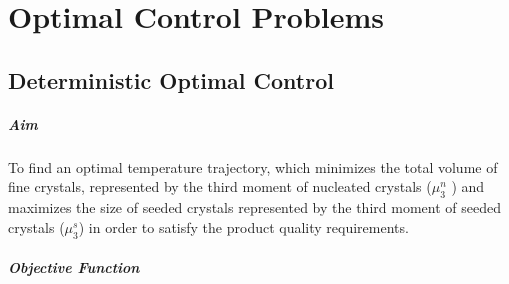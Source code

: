 
\chapter{Optimal Control Problems}

\section{Deterministic Optimal Control}


\paragraph{Aim}
To find an optimal temperature trajectory, which minimizes the total volume of fine crystals, represented by the third moment of nucleated crystals ($\mu_{3}^{n}$ ) and maximizes the size of seeded crystals represented by the third moment of seeded crystals ($\mu_{3}^{s}$) in order to satisfy the product quality requirements.

\paragraph{Objective Function}
\begin{equation*}

\end{equation*}
